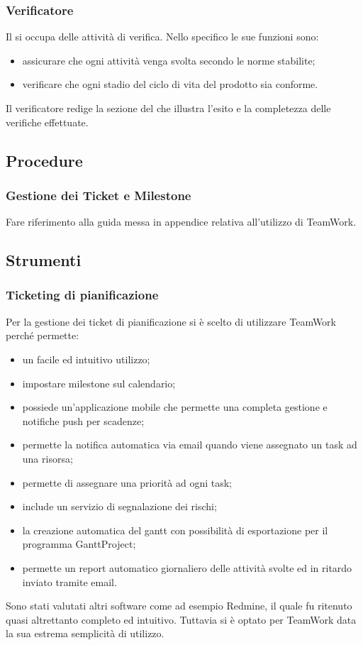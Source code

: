 		\subsubsection{Verificatore}
			Il  si occupa delle attività di verifica. Nello specifico le sue funzioni sono:
			\begin{itemize}
				\item assicurare che ogni attività venga svolta secondo le norme stabilite;
				\item verificare che ogni stadio del ciclo di vita del prodotto sia conforme.
			\end{itemize}
			Il verificatore redige la sezione del  che illustra l’esito e la completezza delle verifiche effettuate.
			\subsection{Procedure}
				\subsubsection{Gestione dei Ticket e Milestone}
					Fare riferimento alla guida messa in appendice relativa all'utilizzo di TeamWork.
			\subsection{Strumenti}
				\subsubsection{Ticketing di pianificazione}
					Per la gestione dei ticket di pianificazione si è scelto di utilizzare TeamWork perché permette:
					\begin{itemize}
						\item un facile ed intuitivo utilizzo;
						\item impostare milestone sul calendario;
						\item possiede un'applicazione mobile che permette una completa gestione e notifiche push per scadenze;
						\item permette la notifica automatica via email quando viene assegnato un task ad una risorsa;
						\item permette di assegnare una priorità ad ogni task;
						\item include un servizio di segnalazione dei rischi;
						\item la creazione automatica del gantt con possibilità di esportazione per il programma GanttProject;
						\item permette un report automatico giornaliero delle attività svolte ed in ritardo inviato tramite email.
					\end{itemize}
					Sono stati valutati altri software come ad esempio Redmine, il quale fu ritenuto quasi altrettanto completo ed intuitivo. Tuttavia si è optato per TeamWork data la sua estrema semplicità di utilizzo.\\